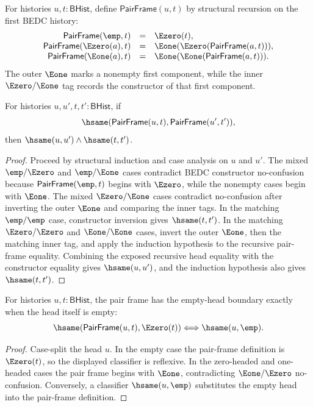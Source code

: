 \begin{definition}
\label{def:list-pair-frame}
For histories $u,t:\mathsf{BHist}$, define $\mathsf{PairFrame}(u,t)$ by
structural recursion on the first BEDC history:
$$
\begin{array}{rcl}
\mathsf{PairFrame}(\emp,t) &=& \Ezero(t),\\
\mathsf{PairFrame}(\Ezero(a),t) &=& \Eone(\Ezero(\mathsf{PairFrame}(a,t))),\\
\mathsf{PairFrame}(\Eone(a),t) &=& \Eone(\Eone(\mathsf{PairFrame}(a,t))).
\end{array}
$$
The outer $\Eone$ marks a nonempty first component, while the inner
$\Ezero/\Eone$ tag records the constructor of that first component.
\end{definition}

\begin{lemma}
\label{lem:list-pair-frame-injectivity}
For histories $u,u',t,t':\mathsf{BHist}$, if
$$
\hsame(\mathsf{PairFrame}(u,t),\mathsf{PairFrame}(u',t')),
$$
then $\hsame(u,u')\land\hsame(t,t')$.
\end{lemma}
\begin{proof}
Proceed by structural induction and case analysis on $u$ and $u'$. The mixed
$\emp/\Ezero$ and $\emp/\Eone$ cases contradict BEDC constructor no-confusion
because $\mathsf{PairFrame}(\emp,t)$ begins with $\Ezero$, while the nonempty
cases begin with $\Eone$. The mixed $\Ezero/\Eone$ cases contradict
no-confusion after inverting the outer $\Eone$ and comparing the inner tags. In
the matching $\emp/\emp$ case, constructor inversion gives $\hsame(t,t')$. In
the matching $\Ezero/\Ezero$ and $\Eone/\Eone$ cases, invert the outer
$\Eone$, then the matching inner tag, and apply the induction hypothesis to the
recursive pair-frame equality. Combining the exposed recursive head equality
with the constructor equality gives $\hsame(u,u')$, and the induction
hypothesis also gives $\hsame(t,t')$.
\end{proof}

\begin{theorem}
\label{thm:list-pair-frame-empty-head-iff}
For histories $u,t:\mathsf{BHist}$, the pair frame has the empty-head boundary
exactly when the head itself is empty:
$$
\hsame(\mathsf{PairFrame}(u,t),\Ezero(t))
\Longleftrightarrow
\hsame(u,\emp).
$$
\end{theorem}
\begin{proof}
Case-split the head $u$. In the empty case the pair-frame definition is
$\Ezero(t)$, so the displayed classifier is reflexive. In the zero-headed and
one-headed cases the pair frame begins with $\Eone$, contradicting
$\Eone/\Ezero$ no-confusion. Conversely, a classifier $\hsame(u,\emp)$
substitutes the empty head into the pair-frame definition.
\end{proof}

